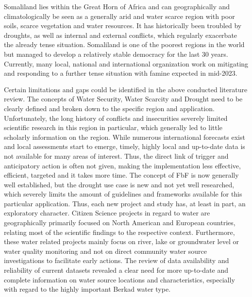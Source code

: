 Somaliland lies within the Great Horn of Africa and can geographically and climatologically be seen as a generally arid and water scarce region with poor soils, scarce vegetation and water resources. It has historically been troubled by droughts, as well as internal and external conflicts, which regularly exacerbate the already tense situation. Somaliland is one of the poorest regions in the world but managed to develop a relatively stable democracy for the last 30 years. Currently, many local, national and international organization work on mitigating and responding to a further tense situation with famine expected in mid-2023. 

Certain limitations and gaps could be identified in the above conducted literature review. The concepts of Water Security, Water Scarcity and Drought need to be clearly defined and broken down to the specific region and application. Unfortunately, the long history of conflicts and insecurities severely limited scientific research in this region in particular, which generally led to little scholarly information on the region.\newline
While numerous international forecasts exist and local assessments start to emerge, timely, highly local and up-to-date data is not available for many areas of interest. Thus, the direct link of trigger and anticipatory action is often not given, making the implementation less effective, efficient, targeted and it takes more time. 
The concept of FbF is now generally well established, but the drought use case is new and not yet well researched, which severely limits the amount of guidelines and frameworks available for this particular application. Thus, each new project and study has, at least in part, an exploratory character.
Citizen Science projects in regard to water are geographically primarily focused on North American and European countries, relating most of the scientific findings to the respective context. Furthermore, these water related projects mainly focus on river, lake or groundwater level or water quality monitoring and not on direct community water source investigations to facilitate early actions. The review of data availability and reliability of current datasets revealed a clear need for more up-to-date and complete information on water source locations and characteristics, especially with regard to the highly important Berkad water type. 

